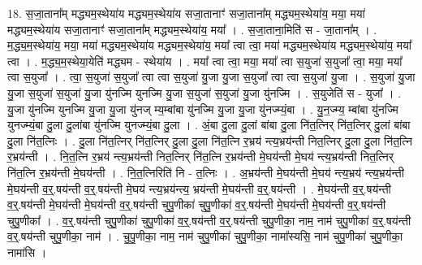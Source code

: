 \documentclass[17pt]{extarticle}
\begin{document}
18. स॒जा॒ताना᳚म् मद्ध्यम॒स्थेया॑य मद्ध्यम॒स्थेया॑य सजा॒तानाꣳ॑ सजा॒ताना᳚म् मद्ध्यम॒स्थेया॑य॒ मया॒ मया॑ मद्ध्यम॒स्थेया॑य सजा॒तानाꣳ॑ सजा॒ताना᳚म् मद्ध्यम॒स्थेया॑य॒ मया᳚ । . स॒जा॒ताना॒मिति॑ स - जा॒ताना᳚म् । . म॒द्ध्य॒म॒स्थेया॑य॒ मया॒ मया॑ मद्ध्यम॒स्थेया॑य मद्ध्यम॒स्थेया॑य॒ मया᳚ त्वा त्वा॒ मया॑ मद्ध्यम॒स्थेया॑य मद्ध्यम॒स्थेया॑य॒ मया᳚ त्वा । . म॒द्ध्य॒म॒स्थेया॒येति॑ मद्ध्यम - स्थेया॑य । . मया᳚ त्वा त्वा॒ मया॒ मया᳚ त्वा स॒युजा॑ स॒युजा᳚ त्वा॒ मया॒ मया᳚ त्वा स॒युजा᳚ । . त्वा॒ स॒युजा॑ स॒युजा᳚ त्वा त्वा स॒युजा॑ यु॒जा यु॒जा स॒युजा᳚ त्वा त्वा स॒युजा॑ यु॒जा । . स॒युजा॑ यु॒जा यु॒जा स॒युजा॑ स॒युजा॑ यु॒जा यु॑नज्मि युनज्मि यु॒जा स॒युजा॑ स॒युजा॑ यु॒जा यु॑नज्मि । . स॒युजेति॑ स - युजा᳚ । . यु॒जा यु॑नज्मि युनज्मि यु॒जा यु॒जा यु॑नज् म्य॒म्बांबा यु॑नज्मि यु॒जा यु॒जा यु॑नज्म्यं॒बा । . यु॒न॒ज्म्य॒ म्बांबा यु॑नज्मि युनज्म्यं॒बा दु॒ला दु॒लांबा यु॑नज्मि युनज्म्यं॒बा दु॒ला । . अं॒बा दु॒ला दु॒लां बांबा दु॒ला नि॑त॒त्निर् नि॑त॒त्निर् दु॒लां बांबा दु॒ला नि॑त॒त्निः । . दु॒ला नि॑त॒त्निर् नि॑त॒त्निर् दु॒ला दु॒ला नि॑त॒त्नि र॒भ्रय॑ न्त्य॒भ्रय॑न्ती नित॒त्निर् दु॒ला दु॒ला नि॑त॒त्नि र॒भ्रय॑न्ती । . नि॒त॒त्नि र॒भ्रय॑ न्त्य॒भ्रय॑न्ती नित॒त्निर् नि॑त॒त्नि र॒भ्रय॑न्ती मे॒घय॑न्ती मे॒घय॑ न्त्य॒भ्रय॑न्ती नित॒त्निर् नि॑त॒त्नि र॒भ्रय॑न्ती मे॒घय॑न्ती । . नि॒त॒त्निरिति॑ नि - त॒त्निः । . अ॒भ्रय॑न्ती मे॒घय॑न्ती मे॒घय॑ न्त्य॒भ्रय॑ न्त्य॒भ्रय॑न्ती मे॒घय॑न्ती व॒र्॒.षय॑न्ती व॒र्॒.षय॑न्ती मे॒घय॑ न्त्य॒भ्रय॑न्त्य॒ भ्रय॑न्ती मे॒घय॑न्ती व॒र्॒.षय॑न्ती । . मे॒घय॑न्ती व॒र्॒.षय॑न्ती व॒र्॒.षय॑न्ती मे॒घय॑न्ती मे॒घय॑न्ती व॒र्॒.षय॑न्ती चुपु॒णीका॑ चुपु॒णीका॑ व॒र्॒.षय॑न्ती मे॒घय॑न्ती मे॒घय॑न्ती व॒र्॒.षय॑न्ती चुपु॒णीका᳚ । . व॒र्॒.षय॑न्ती चुपु॒णीका॑ चुपु॒णीका॑ व॒र्॒.षय॑न्ती व॒र्॒.षय॑न्ती चुपु॒णीका॒ नाम॒ नाम॑ चुपु॒णीका॑ व॒र्॒.षय॑न्ती व॒र्॒.षय॑न्ती चुपु॒णीका॒ नाम॑ । . चु॒पु॒णीका॒ नाम॒ नाम॑ चुपु॒णीका॑ चुपु॒णीका॒ नामा᳚स्यसि॒ नाम॑ चुपु॒णीका॑ चुपु॒णीका॒ नामा॑सि । \newline
\end{document}
